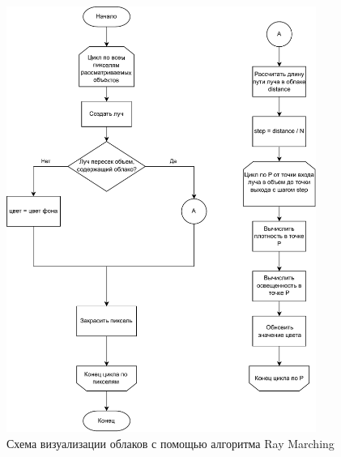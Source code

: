 \begin{figure}[h]
	\centering
	\includegraphics[width=0.9\textwidth]{assets/img/renderscheme.pdf} %
	\caption{Схема визуализации облаков с помощью алгоритма Ray Marching}
	\label{fig:renderscheme}
\end{figure}

